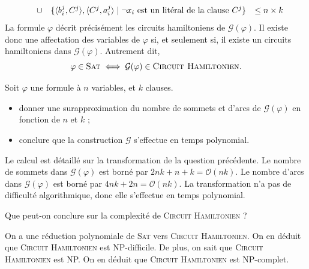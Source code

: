 \begin{exercice}[\textsc{Circuit Hamiltonien} est NP-complet%
    \footnote{Vidéo détaillée de la réduction de \textsc{3-SAT} à \textsc{Cycle Hamiltonien} : \url{https://www.youtube.com/watch?v=OHnX-R_SBpM}}]
\begin{corrections}
$$\begin{array}{rcl@{\quad}l}
      &\cup& \{ \langle b_i^j, C^j \rangle,            \langle C^j, a_i^j \rangle            \mid \lnot x_i \text{ est un litéral de la clause } C^j \}    & \le n \times k
    \end{array}
    $$
    La formule $\varphi$ décrit précisément les circuits hamiltoniens de $\mathcal{G}(\varphi)$.
    Il existe donc une affectation des variables de $\varphi$ si, et seulement si,
    il existe un circuits hamiltoniens dans $\mathcal{G}(\varphi)$.
    Autrement dit, $$\varphi \in \textsc{Sat} \iff \mathcal{G}(\varphi) \in \textsc{Circuit Hamiltonien}.$$
  \end{corrections}
  
  \begin{questions}
  \item Soit $\varphi$ une formule à $n$ variables, et $k$ clauses.
    \begin{itemize}
    \item donner une surapproximation du nombre de sommets et d'arcs de $\mathcal{G}(\varphi)$ en fonction de $n$ et $k$ ;
    \item conclure que la construction $\mathcal{G}$ s'effectue en temps polynomial.
    \end{itemize}
  \end{questions}
  \begin{corrections}
    Le calcul est détaillé sur la transformation de la question précédente.
    Le nombre de sommets dans $\mathcal{G}(\varphi)$ est borné par $2 n k + n + k = \mathcal{O}(n k)$.
    Le nombre d'arcs dans $\mathcal{G}(\varphi)$ est borné par $4 n k + 2 n = \mathcal{O}(n k)$.
    La transformation n'a pas de difficulté algorithmique, donc elle s'effectue en temps polynomial.
  \end{corrections}
  
  \begin{questions}
  \item Que peut-on conclure sur la complexité de \textsc{Circuit Hamiltonien} ? 
  \end{questions}
  \begin{corrections}
    On a une réduction polynomiale de \textsc{Sat} vers \textsc{Circuit Hamiltonien}.
    On en déduit que \textsc{Circuit Hamiltonien} est NP-difficile.
    De plus, on sait que \textsc{Circuit Hamiltonien} est NP.
    On en déduit que \textsc{Circuit Hamiltonien} est NP-complet.
  \end{corrections}

\end{exercice}

\endgroup
\endinput
